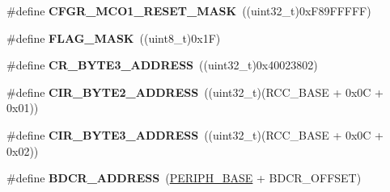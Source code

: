 \begin{DoxyCompactItemize}
\item 
\#define {\bfseries C\+F\+G\+R\+\_\+\+M\+C\+O1\+\_\+\+R\+E\+S\+E\+T\+\_\+\+M\+A\+SK}~((uint32\+\_\+t)0x\+F89\+F\+F\+F\+F\+F)\hypertarget{group___r_c_c_ga51f5130a66963090dc02b4ebd47e2f83}{}\label{group___r_c_c_ga51f5130a66963090dc02b4ebd47e2f83}

\item 
\#define {\bfseries F\+L\+A\+G\+\_\+\+M\+A\+SK}~((uint8\+\_\+t)0x1\+F)\hypertarget{group___r_c_c_ga890221cb651a3f30f6d1bca0d9b0e13d}{}\label{group___r_c_c_ga890221cb651a3f30f6d1bca0d9b0e13d}

\item 
\#define {\bfseries C\+R\+\_\+\+B\+Y\+T\+E3\+\_\+\+A\+D\+D\+R\+E\+SS}~((uint32\+\_\+t)0x40023802)\hypertarget{group___r_c_c_ga9b2724575bb34217aeddcb69c41a1547}{}\label{group___r_c_c_ga9b2724575bb34217aeddcb69c41a1547}

\item 
\#define {\bfseries C\+I\+R\+\_\+\+B\+Y\+T\+E2\+\_\+\+A\+D\+D\+R\+E\+SS}~((uint32\+\_\+t)(R\+C\+C\+\_\+\+B\+A\+SE + 0x0\+C + 0x01))\hypertarget{group___r_c_c_gaab58c3f3f81bf1ab9a14cf3fececd8c4}{}\label{group___r_c_c_gaab58c3f3f81bf1ab9a14cf3fececd8c4}

\item 
\#define {\bfseries C\+I\+R\+\_\+\+B\+Y\+T\+E3\+\_\+\+A\+D\+D\+R\+E\+SS}~((uint32\+\_\+t)(R\+C\+C\+\_\+\+B\+A\+SE + 0x0\+C + 0x02))\hypertarget{group___r_c_c_ga43f47430582c9575970901533e525bb5}{}\label{group___r_c_c_ga43f47430582c9575970901533e525bb5}

\item 
\#define {\bfseries B\+D\+C\+R\+\_\+\+A\+D\+D\+R\+E\+SS}~(\hyperlink{group___peripheral__memory__map_ga9171f49478fa86d932f89e78e73b88b0}{P\+E\+R\+I\+P\+H\+\_\+\+B\+A\+SE} + B\+D\+C\+R\+\_\+\+O\+F\+F\+S\+ET)\hypertarget{group___r_c_c_ga40b5a415d697b6af7babd8a208c92435}{}\label{group___r_c_c_ga40b5a415d697b6af7babd8a208c92435}

\end{DoxyCompactItemize}
